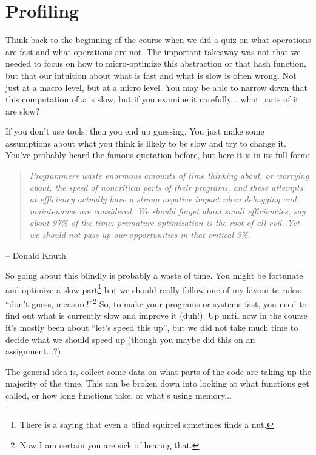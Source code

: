 




\section*{Profiling}

Think back to the beginning of the course when we did a quiz on what operations are fast and what operations are not. The important takeaway was not that we needed to focus on how to micro-optimize this abstraction or that hash function, but that our intuition about what is fast and what is slow is often wrong. Not just at a macro level, but at a micro level. You may be able to narrow down that this computation of $x$ is slow, but if you examine it carefully... what parts of it are slow?

If you don't use tools, then you end up guessing. You just make some assumptions about what you think is likely to be slow and try to change it. You've probably heard the famous quotation before, but here it is in its full form:

\begin{quote}
\textit{Programmers waste enormous amounts of time thinking about, or worrying about, the speed of noncritical parts of their programs, and these attempts at efficiency actually have a strong negative impact when debugging and maintenance are considered. We should forget about small efficiencies, say about 97\% of the time: premature optimization is the root of all evil. Yet we should not pass up our opportunities in that critical 3\%.}
\end{quote}
	\hfill -- Donald Knuth

So going about this blindly is probably a waste of time. You might be fortunate and optimize a slow part\footnote{There is a saying that even a blind squirrel sometimes finds a nut.} but we should really follow one of my favourite rules: ``don't guess, measure!''\footnote{Now I am certain you are sick of hearing that.} So, to make your programs or systems fast, you need to find out what is currently slow and improve it (duh!). Up until now in the course it's mostly been about ``let's speed this up'', but we did not take much time to decide what we should speed up (though you maybe did this on an assignment...?).

The general idea is, collect some data on what parts of the code are taking up the majority of the time. This can be broken down into looking at what functions get called, or how long functions take, or what's using memory...

